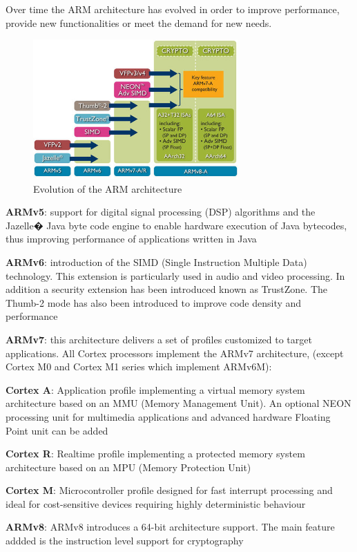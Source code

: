 \documentclass[pdftex,10pt,a4paper]{report}
\newenvironment{packed_item}{
\begin{itemize}
  \setlength{\itemsep}{1pt}
  \setlength{\parskip}{0pt}
  \setlength{\parsep}{0pt}
}{\end{itemize}}
\begin{document}
Over time the ARM architecture has evolved in order to improve performance, provide new functionalities or meet the demand for new needs.
\begin{figure}[h!]
\centering
\includegraphics[width=0.7\textwidth]{./arm_arch.jpg}
\caption{Evolution of the ARM architecture}
\label{Evolution of the ARM architecture}
\end{figure}

\begin{packed_item}
	\item \textbf{ARMv5}: support for digital signal processing (DSP) algorithms and the Jazelle� Java byte code engine to enable hardware execution of Java bytecodes, thus improving performance of applications written in Java
	\item \textbf{ARMv6}: introduction of the SIMD (Single Instruction Multiple Data) technology. This extension is particularly used in audio and video processing. In addition a security extension has been introduced known as TrustZone. The Thumb-2 mode has also been introduced to improve code density and performance
	\item \textbf{ARMv7}: this architecture delivers a set of profiles customized to target applications. All Cortex processors implement the ARMv7 architecture, (except Cortex M0 and Cortex M1 series which implement ARMv6M):
	\begin{packed_item}
		\item \textbf{Cortex A}: Application profile implementing a virtual memory system architecture based on an MMU (Memory Management Unit). An optional NEON processing unit for multimedia applications and advanced hardware Floating Point unit can be added
		\item \textbf{Cortex R}: Realtime profile implementing a protected memory system architecture based on an MPU (Memory Protection Unit)
		\item \textbf{Cortex M}: Microcontroller profile designed for fast interrupt processing and ideal for cost-sensitive devices requiring highly deterministic behaviour
	\end{packed_item}
	\item \textbf{ARMv8}: ARMv8 introduces a 64-bit architecture support. The main feature addded is the instruction level support for cryptography
\end{packed_item}
\end{document}
